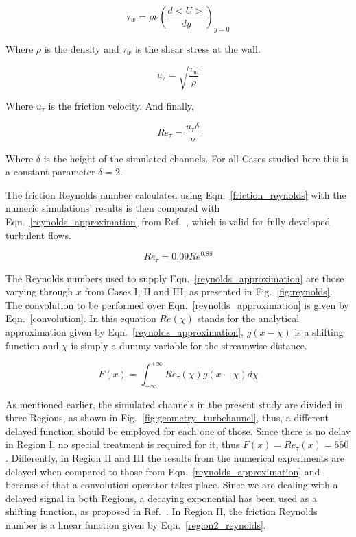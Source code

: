 \documentclass[twocolumn,10pt]{asme2e}
\begin{document}
\begin{equation}
{\tau}_w = \rho\nu\left(\frac{d<U>}{dy}\right)_{y=0}
\label{shear_wall}
\end{equation}

Where \(\rho\) is the density and \({\tau}_w\)  is the shear stress at the wall.

\begin{equation}
u_{\tau} = \sqrt{\frac{{\tau}_w}{\rho}}
\label{u_t}
\end{equation}

Where \(u_{\tau}\) is the friction velocity. And finally,

\begin{equation}
Re_{\tau} = \frac{u_{\tau}\delta}{\nu}
\label{friction_reynolds}
\end{equation}

Where \(\delta\) is the height of the simulated channels. For all Cases studied here this is a constant parameter \(\delta=2\).

The friction Reynolds number calculated using Eqn.~\ref{friction_reynolds} with the numeric simulations' results is then compared with Eqn.~\ref{reynolds_approximation} from Ref.~\cite{pope}, which is valid for fully developed turbulent flows.

\begin{equation}
Re_{\tau} = 0.09Re^{0.88}
\label{reynolds_approximation}
\end{equation}

The Reynolds numbers used to supply Eqn.~\ref{reynolds_approximation} are those varying through \(x\) from Cases I, II and III, as presented in Fig.~\ref{fig:reynolds}. The convolution to be performed over Eqn.~\ref{reynolds_approximation} is given by Eqn.~\ref{convolution}. In this equation \(Re(\chi)\) stands for the analytical approximation given by Eqn.~\ref{reynolds_approximation}, \(g(x-\chi)\)  is a shifting function and \(\chi\) is simply a dummy variable for the streamwise distance.

\begin{equation}
F(x) =  \int_{-\infty}^{+\infty} Re_{\tau}(\chi)g(x-\chi)d\chi
\label{convolution}
\end{equation}

As mentioned earlier, the simulated channels in the present study are divided in three Regions, as shown in Fig.~\ref{fig:geometry_turbchannel}, thus, a different delayed function should be employed for each one of those. Since there is no delay in Region I, no special treatment is required for it, thus \(F(x)=Re_{\tau}(x)=550\). Differently, in Region II and III the results from the numerical experiments are delayed when compared to those from Eqn.~\ref{reynolds_approximation} and because of that a convolution operator takes place. Since we are dealing with a delayed signal in both Regions, a decaying exponential has been used as a shifting function, as proposed in Ref.~\cite{signals}. In Region II, the friction Reynolds number is a linear function given by Eqn.~\ref{region2_reynolds}.
\end{document}
